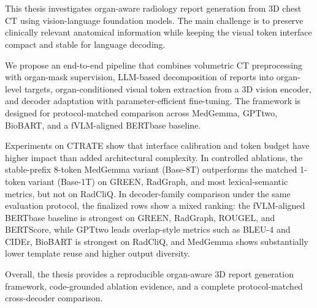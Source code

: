 \chapter{\abstractname}

This thesis investigates organ-aware radiology report generation from 3D chest CT using vision-language foundation models. The main challenge is to preserve clinically relevant anatomical information while keeping the visual token interface compact and stable for language decoding.

We propose an end-to-end pipeline that combines volumetric CT preprocessing with organ-mask supervision, LLM-based decomposition of reports into organ-level targets, organ-conditioned visual token extraction from a 3D vision encoder, and decoder adaptation with parameter-efficient fine-tuning. The framework is designed for protocol-matched comparison across MedGemma, \ac{GPTtwo}, BioBART, and a fVLM-aligned \ac{BERTbase} baseline.

Experiments on \ac{CTRATE} show that interface calibration and token budget have higher impact than added architectural complexity. In controlled ablations, the stable-prefix 8-token MedGemma variant (Base-8T) outperforms the matched 1-token variant (Base-1T) on \ac{GREEN}, \ac{RadGraph}, and most lexical-semantic metrics, but not on \ac{RadCliQ}. In decoder-family comparison under the same evaluation protocol, the finalized rows show a mixed ranking: the fVLM-aligned \ac{BERTbase} baseline is strongest on \ac{GREEN}, \ac{RadGraph}, \ac{ROUGEL}, and \ac{BERTScore}, while \ac{GPTtwo} leads overlap-style metrics such as BLEU-4 and \ac{CIDEr}, BioBART is strongest on \ac{RadCliQ}, and MedGemma shows substantially lower template reuse and higher output diversity.

Overall, the thesis provides a reproducible organ-aware 3D report generation framework, code-grounded ablation evidence, and a complete protocol-matched cross-decoder comparison.

